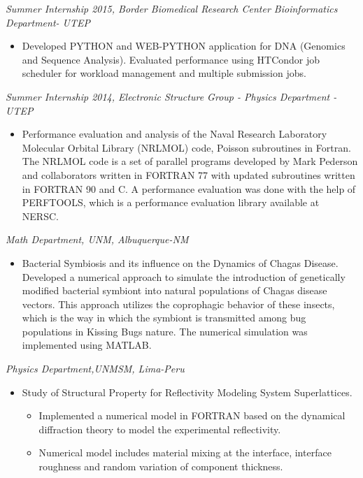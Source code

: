 \documentclass[margin]{res}
\begin{document}
\begin{resume}
{\sl Summer Internship 2015, Border Biomedical Research Center Bioinformatics Department- UTEP} %
\begin{itemize}\itemsep -2pt
\item Developed PYTHON and WEB-PYTHON application for DNA (Genomics and Sequence Analysis). 
Evaluated performance using HTCondor job scheduler for workload management and multiple submission jobs. 
\end{itemize}
%
{\sl Summer Internship 2014,  Electronic Structure Group - Physics Department - UTEP} %
\begin{itemize}\itemsep -2pt
\item Performance evaluation and analysis of the Naval Research Laboratory Molecular Orbital Library (NRLMOL) code, Poisson subroutines in Fortran.
The NRLMOL code is a set of parallel programs developed by Mark Pederson and collaborators written in FORTRAN 77
with updated subroutines written in FORTRAN 90 and C. A performance evaluation was done with the help of PERFTOOLS, which is a performance evaluation library available at NERSC.
\end{itemize} 
%
{\sl Math Department, UNM, Albuquerque-NM}%
\begin{itemize}  \itemsep -2pt %
\item Bacterial Symbiosis and its influence on the Dynamics of Chagas Disease.
Developed a numerical approach to simulate the introduction of genetically modified bacterial symbiont into natural populations of Chagas disease vectors.
This approach utilizes the coprophagic behavior of these insects, which is the way in which the symbiont is transmitted among
bug populations in Kissing Bugs nature. The numerical simulation was implemented using  MATLAB.
\end{itemize}
%
{\sl Physics Department,UNMSM, Lima-Peru} %
\begin{itemize}\itemsep -2pt
\item Study of Structural Property for Reflectivity Modeling System Superlattices.
\begin{itemize}
\item Implemented a numerical model in FORTRAN  based on the dynamical diffraction theory to model the experimental reflectivity.
\item Numerical model includes material mixing at the interface, interface roughness and random variation of component thickness.

\end{itemize}
\end{itemize}
\end{resume}
\end{document}
